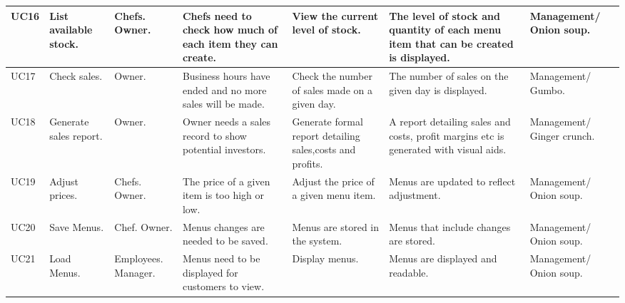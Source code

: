 \begin{tabularx}{\linewidth}{|X|X|X|X|X|X|X|}
\hline
UC16 & List available stock. & Chefs. Owner. & Chefs need to check how much of each item they can create. & View the current level of stock. & The level of stock and quantity of each menu item that can be created is displayed. & Management/ Onion soup. \\
\hline
UC17 & Check sales. & Owner. & Business hours have ended and no more sales will be made. & Check the number of sales made on a given day. & The number of sales on the given day is displayed. & Management/ Gumbo. \\
\hline
UC18 & Generate sales report. & Owner. & Owner needs a sales record to show potential investors. & Generate formal report detailing sales,costs and profits. & A report detailing sales and costs, profit margins etc is generated with visual aids. & Management/ Ginger crunch. \\
\hline
UC19 & Adjust prices. & Chefs. Owner. & The price of a given item is too high or low. & Adjust the price of a given menu item. & Menus are updated to reflect adjustment. & Management/ Onion soup. \\
\hline
UC20 & Save Menus. & Chef. Owner. & Menus changes are needed to be saved. & Menus are stored in the system. & Menus that include changes are stored. & Management/ Onion soup. \\
\hline
UC21 & Load Menus. & Employees. Manager. & Menus need to be displayed for customers to view. & Display menus. & Menus are displayed and readable. & Management/ Onion soup. \\
\hline
\end{tabularx}
